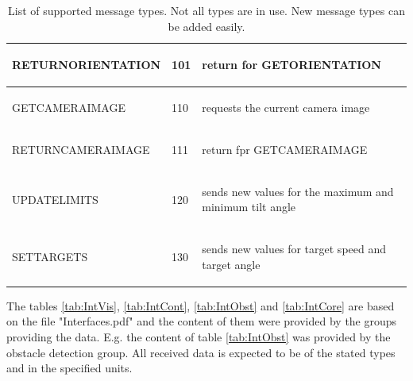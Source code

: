\documentclass[]{scrreprt}
\begin{document}
\begin{table}[H]
\begin{tabular}{|l|l|l|}
			\hline 
			RETURNORIENTATION & 101 & 
			\begin{pbox}{7.0cm}{\vspace{.2\baselineskip}
					return for GETORIENTATION
					\vspace{.3\baselineskip}}
			\end{pbox}\\
			\hline 
			GETCAMERAIMAGE & 110 & 
			\begin{pbox}{7.0cm}{\vspace{.2\baselineskip}
					requests the current camera image
					\vspace{.3\baselineskip}}
			\end{pbox}\\
			\hline 
			RETURNCAMERAIMAGE & 111 & 
			\begin{pbox}{7.0cm}{\vspace{.2\baselineskip}
					return fpr GETCAMERAIMAGE
					\vspace{.3\baselineskip}}
			\end{pbox}\\
			\hline 
			UPDATELIMITS & 120 & 
			\begin{pbox}{7.0cm}{\vspace{.2\baselineskip}
					sends new values for the maximum and minimum tilt angle
					\vspace{.3\baselineskip}}
			\end{pbox}\\
			\hline 
			SETTARGETS & 130 & 
			\begin{pbox}{7.0cm}{\vspace{.2\baselineskip}
					sends new values for target speed and target angle
					\vspace{.3\baselineskip}}
			\end{pbox}\\
			\hline 
		\end{tabular}
		\caption{List of supported message types. Not all types are in use. New message types can be added easily.}
		\label{tab:messageTypes}

	\end{table}
	
	The tables \ref{tab:IntVis}, \ref{tab:IntCont}, \ref{tab:IntObst} and \ref{tab:IntCore} are based on the file "Interfaces.pdf" and the content of them were provided by the groups providing the data. E.g. the content of table \ref{tab:IntObst} was provided by the obstacle detection group. All received data is expected to be of the stated types and in the specified units.
	
\end{document}
